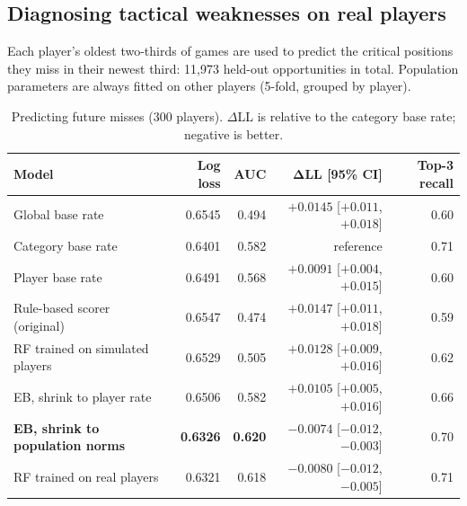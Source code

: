 \subsection{Diagnosing tactical weaknesses on real players}\label{sec:cohort-results}

Each player's oldest two-thirds of games are used to predict the critical positions they miss in their
newest third: 11,973 held-out opportunities in total. Population parameters are always fitted on other
players (5-fold, grouped by player).

\begin{table}[H]
\centering
\small
\caption{Predicting future misses (300 players). $\Delta$LL is relative to the category base rate;
negative is better.}\label{tab:cohort}
\begin{tabular}{lrrrr}
\toprule
\textbf{Model} & \textbf{Log loss} & \textbf{AUC} & $\boldsymbol{\Delta}$\textbf{LL [95\% CI]} & \textbf{Top-3 recall} \\
\midrule
Global base rate & 0.6545 & 0.494 & $+0.0145$ [$+0.011$, $+0.018$] & 0.60 \\
Category base rate & 0.6401 & 0.582 & reference & 0.71 \\
Player base rate & 0.6491 & 0.568 & $+0.0091$ [$+0.004$, $+0.015$] & 0.60 \\
Rule-based scorer (original) & 0.6547 & 0.474 & $+0.0147$ [$+0.011$, $+0.018$] & 0.59 \\
RF trained on simulated players & 0.6529 & 0.505 & $+0.0128$ [$+0.009$, $+0.016$] & 0.62 \\
EB, shrink to player rate & 0.6506 & 0.582 & $+0.0105$ [$+0.005$, $+0.016$] & 0.66 \\
\textbf{EB, shrink to population norms} & \textbf{0.6326} & \textbf{0.620} & $\mathbf{-0.0074}$ [$-0.012$, $-0.003$] & 0.70 \\
RF trained on real players & 0.6321 & 0.618 & $-0.0080$ [$-0.012$, $-0.005$] & 0.71 \\
\bottomrule
\end{tabular}
\end{table}

